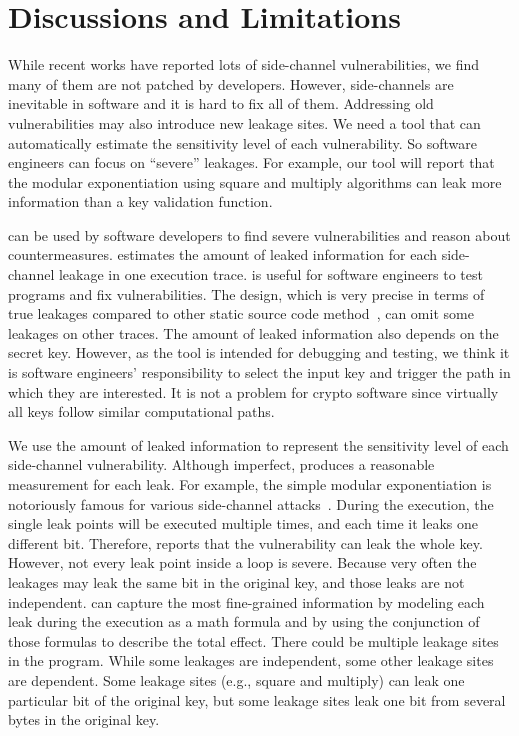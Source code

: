 \section{Discussions and Limitations}
While recent works have reported lots of side-channel vulnerabilities, 
we find many of them are not patched by developers.
However, side-channels are inevitable in software and it is hard to fix all of them. 
Addressing old vulnerabilities may also introduce new leakage
sites. We need a
tool that can automatically estimate the sensitivity level of each vulnerability.
So software engineers can focus on
``severe'' leakages. For example, our tool will report that 
the modular exponentiation using square and multiply algorithms can
leak more information than a key validation function.

\tool{} can be used by software developers to find severe vulnerabilities
and reason about countermeasures.
\tool{} estimates the amount of leaked information for each side-channel leakage
in one execution trace. \tool{} is useful for software
engineers to test programs and fix vulnerabilities.
The design, which is very precise in terms of true leakages compared to other static source code
method~\cite{197207,BacelarAlmeida:2013:FVS:2483313.2483334}, can omit some
leakages on other traces. The amount of leaked information also depends on the secret key.
However, as the tool is intended for debugging and testing,
we think it is software engineers' responsibility to select the input key and trigger 
the path in which they are interested. It is not a problem for crypto software 
since virtually all keys follow similar computational paths.

We use the amount of leaked information to represent the sensitivity level of 
each side-channel vulnerability. Although imperfect, \tool{} produces a reasonable 
measurement for each leak. For example, the simple modular exponentiation is 
notoriously famous for various side-channel attacks~\cite{kocher1996timing}. 
During the execution, the single leak points will be executed multiple times, 
and each time it leaks one different bit. Therefore, \tool{} reports that the 
vulnerability can leak the whole key. However, not every leak point inside a 
loop is severe. Because very often the leakages may leak the same bit in the 
original key, and those leaks are not independent. \tool{} can capture the most 
fine-grained information by modeling each leak during the execution as a math 
formula and by using the conjunction of those formulas to describe the total effect. 
There could be multiple leakage sites in the program. While some leakages are independent, 
some other leakage sites are dependent. Some leakage sites (e.g., square and multiply) 
can leak one particular bit of the original key, but some leakage sites leak one bit 
from several bytes in the original key. 

